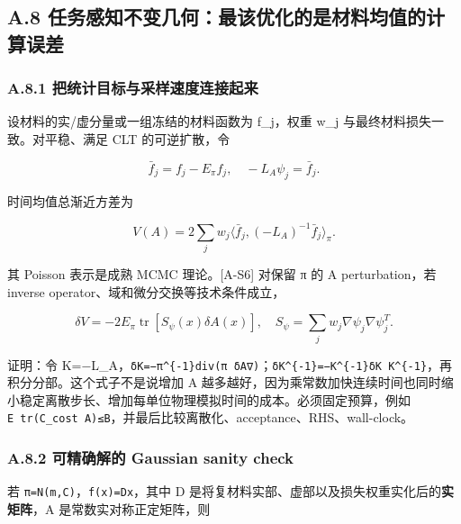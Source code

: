 \documentclass[
  11pt,
  a4paper,
]{article}
\begin{document}
\hypertarget{a.8-ux4efbux52a1ux611fux77e5ux4e0dux53d8ux51e0ux4f55ux6700ux8be5ux4f18ux5316ux7684ux662fux6750ux6599ux5747ux503cux7684ux8ba1ux7b97ux8befux5dee}{%
\subsection{A.8
任务感知不变几何：最该优化的是材料均值的计算误差}\label{a.8-ux4efbux52a1ux611fux77e5ux4e0dux53d8ux51e0ux4f55ux6700ux8be5ux4f18ux5316ux7684ux662fux6750ux6599ux5747ux503cux7684ux8ba1ux7b97ux8befux5dee}}

\hypertarget{a.8.1-ux628aux7edfux8ba1ux76eeux6807ux4e0eux91c7ux6837ux901fux5ea6ux8fdeux63a5ux8d77ux6765}{%
\subsubsection{A.8.1
把统计目标与采样速度连接起来}\label{a.8.1-ux628aux7edfux8ba1ux76eeux6807ux4e0eux91c7ux6837ux901fux5ea6ux8fdeux63a5ux8d77ux6765}}

设材料的实/虚分量或一组冻结的材料函数为 f\_\allowbreak{}j，权重 w\_\allowbreak{}j
与最终材料损失一致。对平稳、满足 CLT 的可逆扩散，令

\[
\bar f_j=f_j-E_\pi f_j,\quad -L_A\psi_j=\bar f_j.
\]

时间均值总渐近方差为

\[
V(A)=2\sum_jw_j\langle\bar f_j,(-L_A)^{-1}\bar f_j\rangle_\pi.
\]

其 Poisson 表示是成熟 MCMC 理论。{[}A-S6{]} 对保留 π 的 A
perturbation，若 inverse operator、域和微分交换等技术条件成立，

\[
\boxed{\delta V=-2E_\pi\operatorname{tr}[S_\psi(x)\delta A(x)],
\quad S_\psi=\sum_jw_j\nabla\psi_j\nabla\psi_j^T.}\tag{G4}
\]

证明：令
K=−L\_\allowbreak{}A，\texttt{δK=−π\^{}\{-1\}div(π\ δA∇)}；\texttt{δK\^{}\{-1\}=−K\^{}\{-1\}δK\ K\^{}\{-1\}}，再积分分部。这个式子不是说增加
A
越多越好，因为乘常数加快连续时间也同时缩小稳定离散步长、增加每单位物理模拟时间的成本。必须固定预算，例如
\texttt{E\ tr(C\_\allowbreak{}cost\ A)≤B}，并最后比较离散化、acceptance、RHS、wall-clock。

\hypertarget{a.8.2-ux53efux7cbeux786eux89e3ux7684-gaussian-sanity-check}{%
\subsubsection{A.8.2 可精确解的 Gaussian sanity
check}\label{a.8.2-ux53efux7cbeux786eux89e3ux7684-gaussian-sanity-check}}

若 \texttt{π=N(m,C)}，\texttt{f(x)=Dx}，其中 D
是将复材料实部、虚部以及损失权重实化后的\textbf{实矩阵}，A
是常数实对称正定矩阵，则
\end{document}
